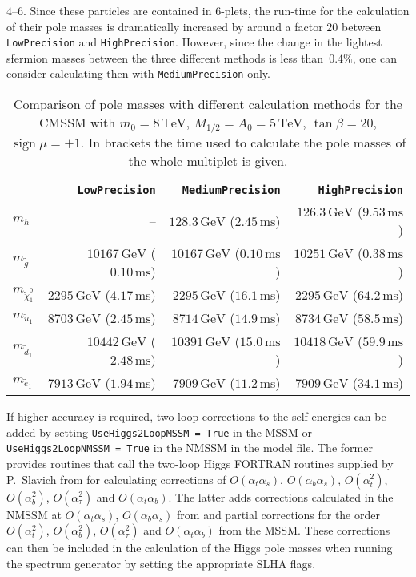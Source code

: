 \documentclass[final,3p,11pt,pdflatex]{elsarticle}
\newcommand{\code}[1]{\lstinline|#1|}  %
\newcommand{\unit}[1]{\,\text{#1}}      %
\DeclareMathOperator{\sign}{sign}
\def\at{\alpha_t}
\def\ab{\alpha_b}
\def\as{\alpha_s}
\def\atau{\alpha_{\tau}}
\def\oatab{O(\at\ab)}
\def\oatas{O(\at\as)}
\def\oabas{O(\ab\as)}
\def\oatq{O(\at^2)}
\def\oabq{O(\ab^2)}
\def\oatauq{O(\atau^2)}
\begin{document}
$4$--$6$.  Since these particles are contained in $6$-plets, the
run-time for the calculation of their pole masses is dramatically
increased by around a factor $20$ between \code{LowPrecision} and
\code{HighPrecision}.  However, since the change in the lightest
sfermion masses between the three different methods is less than
$\unit{0.4\%}$, one can consider calculating then with
\code{MediumPrecision} only.
%
\begin{table}[tbh]
  \centering
  \begin{tabular}{lrrr}
    \toprule
    & \code{LowPrecision}
    & \code{MediumPrecision}
    & \code{HighPrecision}\\
    \midrule
    $m_h$
    & --
    & $128.3\unit{GeV}$ ($2.45\unit{ms}$)
    & $126.3\unit{GeV}$ ($9.53\unit{ms}$) \\
    $m_{\tilde{g}}$
    & $10167\unit{GeV}$ ($0.10\unit{ms}$)
    & $10167\unit{GeV}$ ($0.10\unit{ms}$)
    & $10251\unit{GeV}$ ($0.38\unit{ms}$) \\
    $m_{\tilde{\chi}_1^0}$
    & $2295\unit{GeV}$ ($4.17\unit{ms}$)
    & $2295\unit{GeV}$ ($16.1\unit{ms}$)
    & $2295\unit{GeV}$ ($64.2\unit{ms}$) \\
    $m_{\tilde{u}_1}$
    & $8703\unit{GeV}$ ($2.45\unit{ms}$)
    & $8714\unit{GeV}$ ($14.9\unit{ms}$)
    & $8734\unit{GeV}$ ($58.5\unit{ms}$) \\
    $m_{\tilde{d}_1}$
    & $10442\unit{GeV}$ ($2.48\unit{ms}$)
    & $10391\unit{GeV}$ ($15.0\unit{ms}$)
    & $10418\unit{GeV}$ ($59.9\unit{ms}$) \\
    $m_{\tilde{e}_1}$
    & $7913\unit{GeV}$ ($1.94\unit{ms}$)
    & $7909\unit{GeV}$ ($11.2\unit{ms}$)
    & $7909\unit{GeV}$ ($34.1\unit{ms}$) \\
    \bottomrule
  \end{tabular}
  \caption{Comparison of pole masses with different calculation
    methods for the CMSSM with $m_0=8\unit{TeV}$, $M_{1/2}=A_0=5\unit{TeV}$,
    $\tan\beta=20$, $\sign\mu=+1$.  In brackets the time used to calculate
    the pole masses of the whole multiplet is given.}
  \label{tab:pole-mass-precision-comparison}
\end{table}
%

If higher accuracy is required, two-loop corrections to the
self-energies can be added by setting \code{UseHiggs2LoopMSSM = True}
in the MSSM or \code{UseHiggs2LoopNMSSM = True} in the NMSSM in the
model file.  The former provides routines that call the two-loop Higgs
FORTRAN routines supplied by P.~Slavich from
\cite{Degrassi:2001yf,Brignole:2001jy,Dedes:2002dy,Brignole:2002bz,Dedes:2003km}
for calculating corrections of $\oatas$, $\oabas$, $\oatq$, $\oabq$,
$\oatauq$ and $\oatab$.  The latter adds corrections calculated in the
NMSSM at $\oatas$, $\oabas$ from \cite{Degrassi:2009yq} and partial
corrections for the order $\oatq$, $\oabq$, $\oatauq$ and $\oatab$ from the
MSSM.  These corrections can then be included in the
calculation of the Higgs pole masses when running the spectrum
generator by setting the appropriate SLHA flags.  
\end{document}

